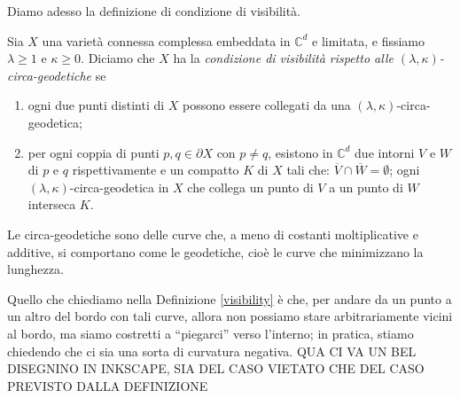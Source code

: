 Diamo adesso la definizione di condizione di visibilità.

\begin{defn} \label{visibility}
    Sia $X$ una varietà connessa complessa embeddata in $\mathbb{C}^d$ e limitata, e fissiamo $\lambda \ge 1$ e $\kappa \ge 0$. Diciamo che $X$ ha la \textit{condizione di visibilità rispetto alle $(\lambda,\kappa)$-circa-geodetiche} se
    \begin{enumerate}
        \item ogni due punti distinti di $X$ possono essere collegati da una $(\lambda,\kappa)$-circa-geodetica;
        \item per ogni coppia di punti $p,q\in\partial X$ con $p\not=q$, esistono in $\mathbb{C}^d$ due intorni $V$ e $W$ di $p$ e $q$ rispettivamente e un compatto $K$ di $X$ tali che: $\overline{V}\cap\overline{W}=\emptyset$; ogni $(\lambda,\kappa)$-circa-geodetica in $X$ che collega un punto di $V$ a un punto di $W$ interseca $K$.
    \end{enumerate}
\end{defn}

Le circa-geodetiche sono delle curve che, a meno di costanti moltiplicative e additive, si comportano come le geodetiche, cioè le curve che minimizzano la lunghezza.

Quello che chiediamo nella Definizione \ref{visibility} è che, per andare da un punto a un altro del bordo con tali curve, allora non possiamo stare arbitrariamente vicini al bordo, ma siamo costretti a ``piegarci'' verso l'interno; in pratica, stiamo chiedendo che ci sia una sorta di curvatura negativa. QUA CI VA UN BEL DISEGNINO IN INKSCAPE, SIA DEL CASO VIETATO CHE DEL CASO PREVISTO DALLA DEFINIZIONE